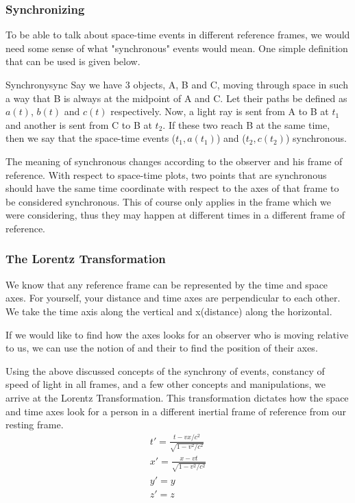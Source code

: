 \documentclass[12pt]{article}
\numberwithin{equation}{section}
\theoremstyle{plain}
\theoremstyle{definition}
\begin{document}
\subsubsection{Synchronizing}

To be able to talk about space-time events in different reference frames, we would need some sense of what "synchronous" events would mean. One simple definition that can be used is given below.

\begin{defn}{Synchrony}{sync}
    Say we have 3 objects, A, B and C, moving through space in such a way that B is always at the midpoint of A and C. Let their paths be defined as $a(t)$, $b(t)$ and $c(t)$ respectively. Now, a light ray is sent from A to B at $t_1$ and another is sent from C to B at $t_2$. If these two reach B at the same time, then we say that the space-time events ($t_1, a(t_1)$) and ($t_2, c(t_2)$) synchronous.
\end{defn}

The meaning of synchronous changes according to the observer and his frame of reference. With respect to space-time plots, two points that are synchronous should have the same time coordinate with respect to the axes of that frame to be considered synchronous. This of course only applies in the frame which we were considering, thus they may happen at different times in a different frame of reference.

\subsubsection{The Lorentz Transformation}

We know that any reference frame can be represented by the time and space axes. For yourself, your distance and time axes are perpendicular to each other. We take the time axis along the vertical and x(distance) along the horizontal.

If we would like to find how the axes looks for an observer who is moving relative to us, we can use the notion of  and their  to find the position of their axes.

Using the above discussed concepts of the synchrony of events, constancy of speed of light in all frames, and a few other concepts and manipulations, we arrive at the Lorentz Transformation. This transformation dictates how the space and time axes look for a person in a different inertial frame of reference from our resting frame. 
\begin{gather}
    t' = \frac{t-vx/c^2}{\sqrt{1-v^2/c^2}} \\
    x' = \frac{x-vt}{\sqrt{1-v^2/c^2}} \\
    y' = y\\
    z' = z
    \label{eq:lorentz}
\end{gather}
\end{document}

